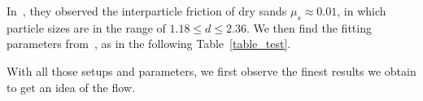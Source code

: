 In~\cite{senetakis_inter-particle_2013}, they observed the interparticle friction of dry sands $\mu_s \approx 0.01$, in which particle sizes are in the range of $1.18 \leq d \leq 2.36$. We then find the fitting parameters from~\cite{srivastava_viscometric_2021}, as in the following Table~\ref{table_test}. 
\begin{table}[ht]
\caption{Fitting parameters of granular materials when the interparticle friction~$\mu_s = 0.01$~\cite{srivastava_viscometric_2021}.
}
\label{table_test}
\end{table}
With all those setups and parameters, we first observe the finest results we obtain to get an idea of the flow.  
